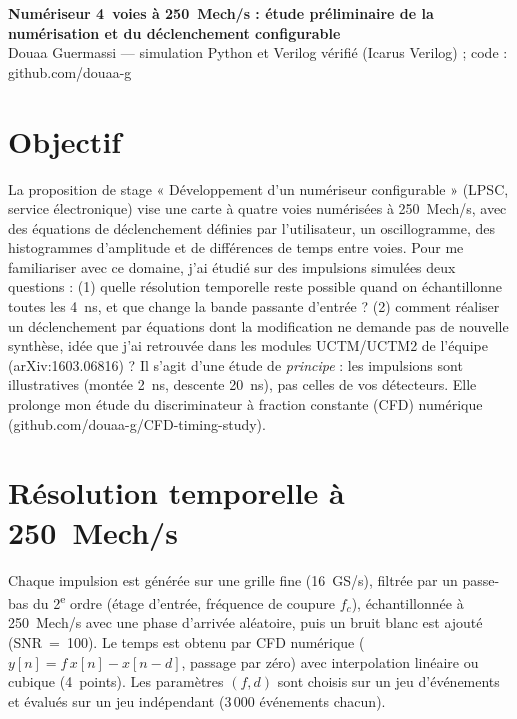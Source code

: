 \documentclass[10pt,a4paper]{article}
\begin{document}
{\LARGE\bfseries Numériseur 4~voies à 250~Mech/s : étude préliminaire de la numérisation et du déclenchement configurable}\\[2pt]
{\small Douaa Guermassi --- simulation Python et Verilog vérifié (Icarus Verilog) ; code : github.com/douaa-g}

\section{Objectif}
La proposition de stage « Développement d'un numériseur configurable » (LPSC, service électronique) vise une carte à quatre voies numérisées à 250~Mech/s, avec des équations de déclenchement définies par l'utilisateur, un oscillogramme, des histogrammes d'amplitude et de différences de temps entre voies. Pour me familiariser avec ce domaine, j'ai étudié sur des impulsions simulées deux questions : (1) quelle résolution temporelle reste possible quand on échantillonne toutes les 4~ns, et que change la bande passante d'entrée ? (2) comment réaliser un déclenchement par équations dont la modification ne demande pas de nouvelle synthèse, idée que j'ai retrouvée dans les modules UCTM/UCTM2 de l'équipe (arXiv:1603.06816) ? Il s'agit d'une étude de \emph{principe} : les impulsions sont illustratives (montée 2~ns, descente 20~ns), pas celles de vos détecteurs. Elle prolonge mon étude du discriminateur à fraction constante (CFD) numérique (github.com/douaa-g/CFD-timing-study).

\section{Résolution temporelle à 250~Mech/s}
Chaque impulsion est générée sur une grille fine (16~GS/s), filtrée par un passe-bas du 2\textsuperscript{e} ordre (étage d'entrée, fréquence de coupure $f_c$), échantillonnée à 250~Mech/s avec une phase d'arrivée aléatoire, puis un bruit blanc est ajouté (SNR~=~100). Le temps est obtenu par CFD numérique ($y[n]=f\,x[n]-x[n-d]$, passage par zéro) avec interpolation linéaire ou cubique (4~points). Les paramètres $(f,d)$ sont choisis sur un jeu d'événements et évalués sur un jeu indépendant (3\,000 événements chacun).
\end{document}
